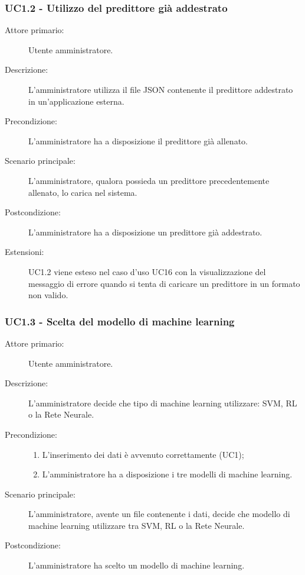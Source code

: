 \subsubsection{UC1.2 - Utilizzo del predittore già addestrato}
\label{sssec:uc1.2}
\begin{description}
  \item[Attore primario:] Utente amministratore.
  \item[Descrizione:] L'amministratore utilizza il file JSON contenente il predittore addestrato in un'applicazione esterna.
  \item[Precondizione:] L'amministratore ha a disposizione il predittore già allenato.
  \item[Scenario principale:] L'amministratore, qualora possieda un predittore precedentemente allenato, lo carica nel sistema.
  \item[Postcondizione:] L'amministratore ha a disposizione un predittore già addestrato.
  \item[Estensioni:] UC1.2 viene esteso nel caso d'uso UC16 con la visualizzazione del messaggio di errore quando si tenta di caricare un predittore in un formato non valido.
\end{description}

\subsubsection{UC1.3 - Scelta del modello di machine learning}
\label{sssec:uc1.3}
\begin{description}
  \item[Attore primario:] Utente amministratore.
  \item[Descrizione:] L'amministratore decide che tipo di machine learning utilizzare: SVM, RL o la Rete Neurale.
  \item[Precondizione:]
  \begin{enumerate}
    \item L'inserimento dei dati è avvenuto correttamente (UC1);
    \item L'amministratore ha a disposizione i tre modelli di machine learning.
  \end{enumerate}
  \item[Scenario principale:] L'amministratore, avente un file contenente i dati, decide che modello di machine learning utilizzare tra SVM, RL o la Rete Neurale.
  \item[Postcondizione:] L'amministratore ha scelto un modello di machine learning.
\end{description}

